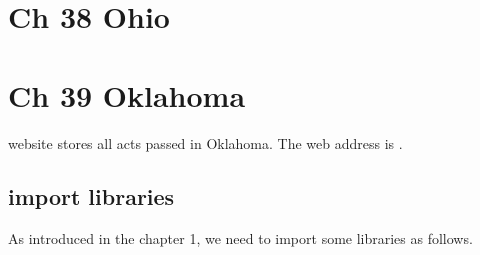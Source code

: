 \documentclass[letterpaper,10pt,english]{jupyterBook}
\begin{document}
\sphinxstepscope


\chapter{Ch 38 Ohio}
\label{\detokenize{ch38:ch-38-ohio}}\label{\detokenize{ch38::doc}}
\sphinxstepscope


\chapter{Ch 39 Oklahoma}
\label{\detokenize{ch39:ch-39-oklahoma}}\label{\detokenize{ch39::doc}}
\sphinxAtStartPar
{} website stores all acts passed in Oklahoma. The web address is .

\sphinxAtStartPar
{}


\section{import libraries}
\label{\detokenize{ch39:import-libraries}}
\sphinxAtStartPar
As introduced in the chapter 1, we need to import some libraries as follows.
\end{document}
